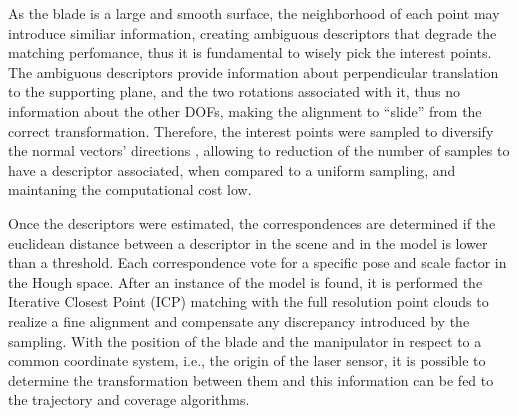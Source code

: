 As the blade is a large and smooth surface, the neighborhood of each point may
introduce similiar information, creating ambiguous descriptors that degrade the
matching perfomance, thus it is fundamental to wisely pick the interest points.
The ambiguous descriptors provide information about perpendicular translation to
the supporting plane, and the two rotations associated with it, thus no
information about the other DOFs, making the alignment to ``slide'' from the
correct transformation. Therefore, the interest points were sampled to
diversify the normal vectors' directions \cite{Rusinkiewicz2001}, allowing to
reduction of the number of samples to have a descriptor associated, when
compared to a uniform sampling, and maintaning the computational cost low.


Once the descriptors were estimated, the correspondences are determined if the
euclidean distance between a descriptor in the scene and in the model is lower
than a threshold. Each correspondence vote for a specific pose and scale factor in the
Hough space. After an instance of the model is found, it is performed the 
Iterative Closest Point (ICP) matching with the full resolution point clouds to
realize a fine alignment and compensate any discrepancy introduced by the
sampling. With the position of the blade and the manipulator in respect to a
common coordinate system, i.e., the origin of the laser sensor, it is possible
to determine the transformation between them and this information can be fed to
the trajectory and coverage algorithms.



